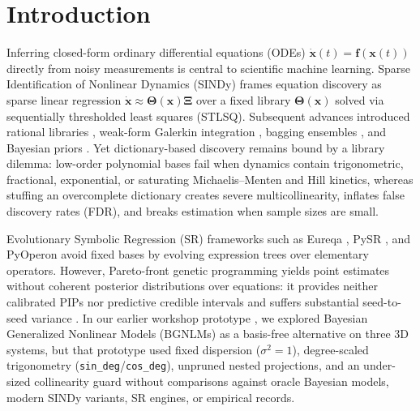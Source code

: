 \documentclass{article}
\begin{document}
\section{Introduction}

Inferring closed-form ordinary differential equations (ODEs) $\dot{\boldsymbol{x}}(t) = \boldsymbol{f}(\boldsymbol{x}(t))$ directly from noisy measurements is central to scientific machine learning. Sparse Identification of Nonlinear Dynamics (SINDy) \citep{brunton2016discovering} frames equation discovery as sparse linear regression $\dot{\boldsymbol{x}} \approx \boldsymbol{\Theta}(\boldsymbol{x})\boldsymbol{\Xi}$ over a fixed library $\boldsymbol{\Theta}(\boldsymbol{x})$ solved via sequentially thresholded least squares (STLSQ). Subsequent advances introduced rational libraries \citep{kaheman2020sindy}, weak-form Galerkin integration \citep{messenger2021weak}, bagging ensembles \citep{fasel2022ensemble}, and Bayesian priors \citep{hirsh2022sparsifying}. Yet dictionary-based discovery remains bound by a library dilemma: low-order polynomial bases fail when dynamics contain trigonometric, fractional, exponential, or saturating Michaelis--Menten and Hill kinetics, whereas stuffing an overcomplete dictionary creates severe multicollinearity, inflates false discovery rates (FDR), and breaks estimation when sample sizes are small.

Evolutionary Symbolic Regression (SR) frameworks such as Eureqa \citep{schmidt2009distilling}, PySR \citep{cranmer2023interpretable}, and PyOperon \citep{burlacu2020operon} avoid fixed bases by evolving expression trees over elementary operators. However, Pareto-front genetic programming yields point estimates without coherent posterior distributions over equations: it provides neither calibrated PIPs nor predictive credible intervals and suffers substantial seed-to-seed variance \citep{lacava2021contemporary}. In our earlier workshop prototype \citep{hubin2025bgnlm}, we explored Bayesian Generalized Nonlinear Models (BGNLMs) \citep{hubin2021flexible} as a basis-free alternative on three 3D systems, but that prototype used fixed dispersion ($\sigma^2=1$), degree-scaled trigonometry (\texttt{sin\_deg}/\texttt{cos\_deg}), unpruned nested projections, and an under-sized collinearity guard without comparisons against oracle Bayesian models, modern SINDy variants, SR engines, or empirical records.
\end{document}
